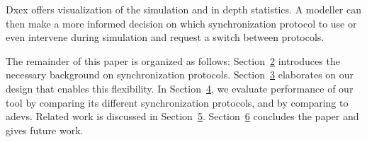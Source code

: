 Dxex offers visualization of the simulation and in depth statistics. A modeller can then make a more informed decision on which synchronization protocol to use or even intervene during simulation and request a switch between protocols. 

The remainder of this paper is organized as follows:
Section~\hyperref[sec:2-background]{2} introduces the necessary background on synchronization protocols.
Section~\hyperref[sec:3-features]{3} elaborates on our design that enables this flexibility.
In Section~\hyperref[sec:4-performance]{4}, we evaluate performance of our tool by comparing its different synchronization protocols, and by comparing to adevs.
Related work is discussed in Section~\hyperref[sec:5-related-work]{5}.
Section~\hyperref[sec:6-conclusion]{6} concludes the paper and gives future work.
